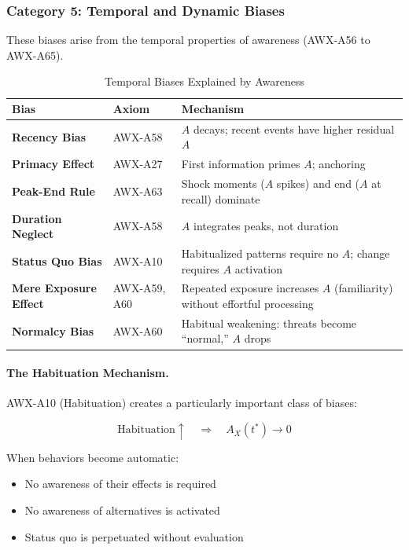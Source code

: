 \subsubsection{Category 5: Temporal and Dynamic Biases}

These biases arise from the temporal properties of awareness (AWX-A56 to AWX-A65).

\begin{table}[htbp]
\centering
\caption{Temporal Biases Explained by Awareness}
\label{tab:temporal-biases}
\renewcommand{\arraystretch}{1.4}
\begin{tabular}{@{}llp{5.5cm}@{}}
\toprule
\textbf{Bias} & \textbf{Axiom} & \textbf{Mechanism} \\
\midrule
\textbf{Recency Bias} & AWX-A58 & $A$ decays; recent events have higher residual $A$ \\
\textbf{Primacy Effect} & AWX-A27 & First information primes $A$; anchoring \\
\textbf{Peak-End Rule} & AWX-A63 & Shock moments ($A$ spikes) and end ($A$ at recall) dominate \\
\textbf{Duration Neglect} & AWX-A58 & $A$ integrates peaks, not duration \\
\textbf{Status Quo Bias} & AWX-A10 & Habitualized patterns require no $A$; change requires $A$ activation \\
\textbf{Mere Exposure Effect} & AWX-A59, A60 & Repeated exposure increases $A$ (familiarity) without effortful processing \\
\textbf{Normalcy Bias} & AWX-A60 & Habitual weakening: threats become ``normal,'' $A$ drops \\
\bottomrule
\end{tabular}
\end{table}

\paragraph{The Habituation Mechanism.}
AWX-A10 (Habituation) creates a particularly important class of biases:

\begin{equation}
\text{Habituation} \uparrow \quad \Rightarrow \quad A_X(t^*) \rightarrow 0
\end{equation}

When behaviors become automatic:
\begin{itemize}
\item No awareness of their effects is required
\item No awareness of alternatives is activated
\item Status quo is perpetuated without evaluation
\end{itemize}

